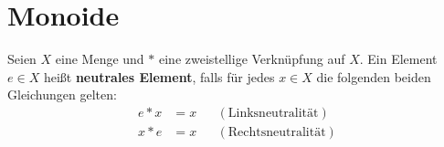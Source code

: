  
\section{Monoide}


\begin{de} \label{def:neutrales} 
    Seien $X$ eine Menge und $*$ eine zweistellige Verknüpfung auf $X$. Ein Element $e\in X$ heißt \textbf{neutrales Element}, falls für jedes $x\in X$ die folgenden beiden Gleichungen gelten:
    \begin{align*}
        e*x & = x && (\text{Linksneutralität}) \\
        x*e & = x && (\text{Rechtsneutralität})
    \end{align*}
\end{de}


